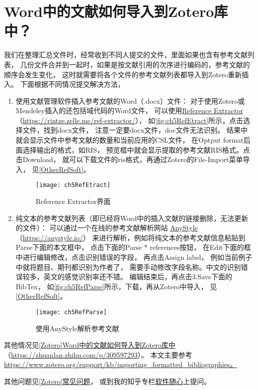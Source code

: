 \documentclass[cn,11pt,chinese]{elegantbook}
\begin{document}
		\section{Word中的文献如何导入到Zotero库中？}\label{sec:RefExtract}	
			我们在整理汇总文件时，经常收到不同人提交的文件，里面如果也含有参考文献列表，
			几份文件合并到一起时，如果是按文献引用的次序进行编码的，参考文献的顺序会发生变化，
			这时就需要将各个文件的参考文献列表都导入到Zotero重新插入。
			下面根据不同情况提交解决方法，
			\begin{enumerate}
				\item 使用文献管理软件插入参考文献的Word（.docx）文件：				
				对于使用Zotero或Mendeley插入的还包括域代码的Word文件，
				可以使用\href{https://rintze.zelle.me/ref-extractor/}
				{Reference Extractor}（\url{https://rintze.zelle.me/ref-extractor/}），
				如\autoref{fig:ch5RefEtract}所示，点击选择文件，找到docx文件，
				注意一定要docx文件，doc文件无法识别。
				结果中就会显示文件中参考文献的数量和当前应用的CSL文件，
				在Optput format后面选择输出的格式，如RIS，
				预览框中就会显示提取的参考文献RIS格式。点击Download，
				就可以下载文件的ris格式，再通过Zotero的File-Import菜单导入，
				见\cref{OtherRefSoft}。
				\begin{figure}[htbp]
					\centering
					\texttt{[image: ch5RefEtract]}
					\caption{Reference Extractor界面}
					\label{fig:ch5RefEtract}
				\end{figure}
		\item 纯文本的参考文献列表（即已经将Word中的插入文献的链接删除，无法更新的文件）：		
			可以通过一个在线的参考文献解析网站
			\href{https://anystyle.io/}{AnyStyle}（\url{https://anystyle.io/}）
			来进行解析，例如将纯文本的参考文献信息粘贴到Parse下面的本文框中，
			点击下面的Parse * references按钮，
			在Edit下面的框中进行编辑修改，点击识别错误的字段，
			再点击Assign label，
			例如当前例子中就将题目、期刊都识别为作者了，
			需要手动修改字段名称。中文的识别错误较多，英文的感觉识别率还不错。
			编辑结束后，再点击3.Save下面的BibTex，
			如\autoref{fig:ch5RefParse}所示，下载，再从Zotero中导入，
			见\cref{OtherRefSoft}。
			\begin{figure}[t]
				\centering
				\texttt{[image: ch5RefParse]}
				\caption{使用AnyStyle解析参考文献}
				\label{fig:ch5RefParse}
			\end{figure}
			\end{enumerate}
			
			其他情况见\href{https://zhuanlan.zhihu.com/p/309597293}
			{[Zotero]Word中的文献如何导入到Zotero库中}
			（\url{https://zhuanlan.zhihu.com/p/309597293}）。			
			本文主要参考
			\url{https://www.zotero.org/support/kb/importing_formatted_bibliographies。}


		其他问题见\href{https://zhuanlan.zhihu.com/p/57379260}{[Zotero]常见问题}，
		或到我的知乎专栏\href{https://zhuanlan.zhihu.com/c_1071081428967743488}{软件随心}上提问。
		
\end{document}
